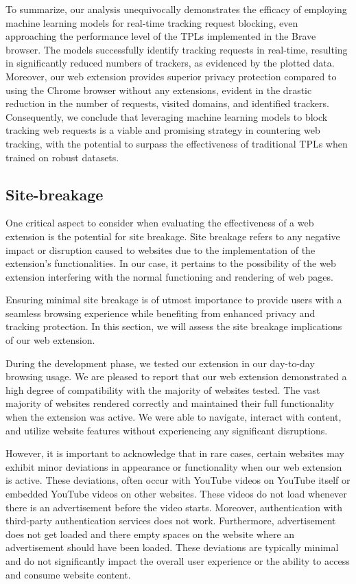 To summarize, our analysis unequivocally demonstrates the efficacy of employing machine learning models for real-time tracking
request blocking, even approaching the performance level of the TPLs implemented in the Brave browser. The models successfully
identify tracking requests in real-time, resulting in significantly reduced numbers of trackers, as evidenced by the plotted data.
Moreover, our web extension provides superior privacy protection compared to using the Chrome browser without any extensions, evident
in the drastic reduction in the number of requests, visited domains, and identified trackers. Consequently, we conclude that leveraging
machine learning models to block tracking web requests is a viable and promising strategy in countering web tracking, with the potential
to surpass the effectiveness of traditional TPLs when trained on robust datasets.






\subsection{Site-breakage}
One critical aspect to consider when evaluating the effectiveness of a web extension is the potential for site breakage.
Site breakage refers to any negative impact or disruption caused to websites due to the implementation of the extension's
functionalities. In our case, it pertains to the possibility of the web extension interfering with the normal functioning
and rendering of web pages.

Ensuring minimal site breakage is of utmost importance to provide users with a seamless browsing experience while benefiting
from enhanced privacy and tracking protection. In this section, we will assess the site breakage implications of our web extension.

During the development phase, we tested our extension in our day-to-day browsing usage. We are pleased to report that our web
extension demonstrated a high degree of compatibility with the majority of websites tested.
The vast majority of websites rendered correctly and maintained their full functionality when the extension was active. We
were able to navigate, interact with content, and utilize website features without experiencing any significant disruptions.

However, it is important to acknowledge that in rare cases, certain websites may exhibit minor deviations in appearance or
functionality when our web extension is active. These deviations, often occur with YouTube videos on YouTube itself or embedded 
YouTube videos on other websites. These videos do not load whenever there is an advertisement before the video starts. Moreover, 
authentication with third-party authentication services does not work. Furthermore, advertisement does not get loaded and there empty 
spaces on the website where an advertisement should have been loaded. These deviations are typically minimal and do not significantly impact
the overall user experience or the ability to access and consume website content.

